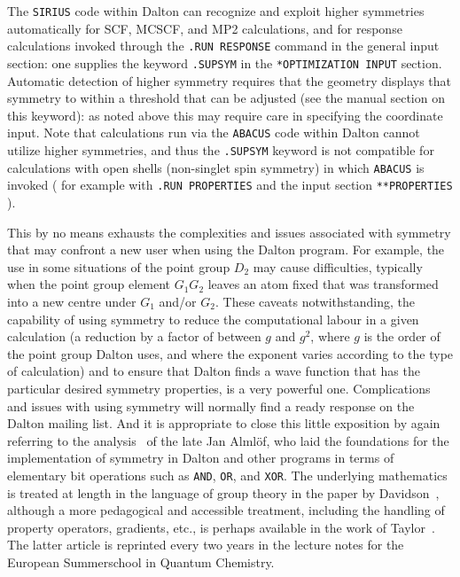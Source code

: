 The \verb|SIRIUS| code within Dalton can recognize and exploit higher
symmetries automatically for SCF, MCSCF, and MP2 calculations, and for
response calculations invoked through the \verb|.RUN RESPONSE| command
in the general input section: one supplies the keyword \verb|.SUPSYM|
in the \verb|*OPTIMIZATION INPUT| section.  Automatic detection of higher
symmetry requires that the geometry displays that symmetry to within a
threshold that can be adjusted (see the manual section on this
keyword): as noted above this may require care in specifying the
coordinate input.  Note that calculations run via the \verb|ABACUS|
code within Dalton cannot utilize higher symmetries, and thus the
\verb|.SUPSYM| keyword is not compatible for calculations 
with open shells (non-singlet spin symmetry) in which
\verb|ABACUS| is invoked ( for example with \verb|.RUN PROPERTIES|
and the input section \verb|**PROPERTIES| ).

This by no means exhausts the complexities and issues associated with
symmetry that may confront a new user when using the Dalton program.
For example, the use in some situations of the point group $D_2$ may
cause difficulties, typically when the point group element $G_1G_2$
leaves an atom fixed that was transformed into a new centre under
$G_1$ and/or $G_2$.
These caveats notwithstanding, the capability of using symmetry to
reduce the computational labour in a given calculation (a reduction by
a factor of between $g$ and $g^2$, where $g$ is the order of the point
group Dalton uses, and where the exponent varies according to the type
of calculation) and to ensure that Dalton finds a wave function that
has the particular desired symmetry properties, is a very powerful
one.  Complications and issues with using symmetry will normally find
a ready response on the Dalton mailing list.  And it is appropriate to
close this little exposition by again referring to the
analysis~\cite{Alm72} of the
late Jan Alml{\"o}f, who laid the foundations for the implementation
of symmetry in Dalton and other programs in terms of elementary bit
operations such as \verb|AND|, \verb|OR|, and \verb|XOR|.  The
underlying mathematics is treated at length in the language of group
theory in the paper by Davidson~\cite{Dav75a}, although a more pedagogical and
accessible treatment, including the handling of property operators,
gradients, etc., is perhaps available in the work of
Taylor~\cite{Tay92}.  The latter article is reprinted every two years
in the lecture notes for the European Summerschool in Quantum
Chemistry.

